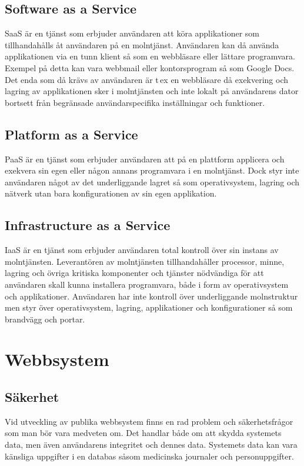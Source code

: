 \subsection{Software as a Service}
\ac{SaaS}\cite{cloud_computing} är en tjänst som erbjuder användaren att köra applikationer som tillhandahålls åt användaren på en molntjänst. Användaren kan då använda applikationen via en tunn klient så som en webbläsare eller lättare programvara. Exempel på detta kan vara webbmail eller kontorsprogram så som Google Docs. Det enda som då krävs av användaren är t\,ex en webbläsare då exekvering och lagring av applikationen sker i molntjänsten och inte lokalt på användarens dator bortsett från begränsade användarspecifika inställningar och funktioner.

\subsection{Platform as a Service}
\ac{PaaS}\cite{cloud_computing} är en tjänst som erbjuder användaren att på en plattform applicera och exekvera sin egen eller någon annans programvara i en molntjänst. Dock styr inte användaren något av det underliggande lagret så som operativsystem, lagring och nätverk utan bara konfigurationen av sin egen applikation. 

\subsection{Infrastructure as a Service}
\ac{IaaS}\cite{cloud_computing} är en tjänst som erbjuder användaren total kontroll över sin instans av molntjänsten. Leverantören av molntjänsten tillhandahåller processor, minne, lagring och övriga kritiska komponenter och tjänster nödvändiga för att användaren skall kunna installera programvara, både i form av operativsystem och applikationer. Användaren har inte kontroll över underliggande molnstruktur men styr över operativsystem, lagring, applikationer och konfigurationer så som brandvägg och portar.

\section{Webbsystem}
\subsection{Säkerhet}
Vid utveckling av publika webbsystem finns en rad problem och säkerhetsfrågor som man bör vara medveten om. Det handlar både om att skydda systemets data, men även användarens integritet och dennes data. Systemets data kan vara känsliga uppgifter i en databas såsom medicinska journaler och personuppgifter. 

